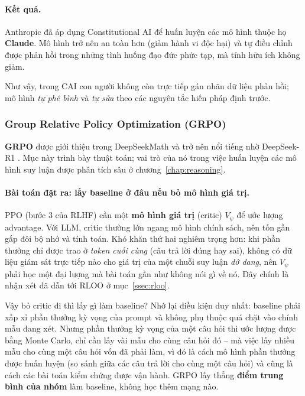 \paragraph{Kết quả.}
    Anthropic đã áp dụng Constitutional AI để huấn luyện các mô hình thuộc họ \textbf{Claude}. Mô hình trở nên an toàn hơn (giảm hành vi độc hại) và tự điều chỉnh được phản hồi trong những tình huống đạo đức phức tạp, mà tính hữu ích không giảm.

\noindent
Như vậy, trong CAI con người không còn trực tiếp gán nhãn dữ liệu phản hồi; mô hình \emph{tự phê bình} và \emph{tự sửa} theo các nguyên tắc hiến pháp định trước.

\subsubsection{Group Relative Policy Optimization (GRPO)}
\label{ssec:grpo}

\textbf{GRPO} được giới thiệu trong DeepSeekMath \cite{shao2024deepseekmath} và trở nên nổi tiếng nhờ DeepSeek-R1 \cite{deepseekai2025r1}. Mục này trình bày thuật toán; vai trò của nó trong việc huấn luyện các mô hình suy luận được phân tích sâu ở chương~\ref{chap:reasoning}.

\paragraph{Bài toán đặt ra: lấy baseline ở đâu nếu bỏ mô hình giá trị.}
PPO (bước 3 của RLHF) cần một \textbf{mô hình giá trị} (critic) $V_\psi$ để ước lượng advantage. Với LLM, critic thường lớn ngang mô hình chính sách, nên tốn gần gấp đôi bộ nhớ và tính toán. Khó khăn thứ hai nghiêm trọng hơn: khi phần thưởng chỉ được trao ở \emph{token cuối cùng} (câu trả lời đúng hay sai), không có dữ liệu giám sát trực tiếp nào cho giá trị của một chuỗi suy luận \emph{dở dang}, nên $V_\psi$ phải học một đại lượng mà bài toán gần như không nói gì về nó. Đây chính là nhận xét đã dẫn tới RLOO ở mục~\ref{ssec:rloo}.

Vậy bỏ critic đi thì lấy gì làm baseline? Nhớ lại điều kiện duy nhất: baseline phải xấp xỉ phần thưởng kỳ vọng của prompt và không phụ thuộc quá chặt vào chính mẫu đang xét. Nhưng phần thưởng kỳ vọng của một câu hỏi thì ước lượng được bằng Monte Carlo, chỉ cần lấy vài mẫu cho cùng câu hỏi đó -- mà việc lấy nhiều mẫu cho cùng một câu hỏi vốn đã phải làm, vì đó là cách mô hình phần thưởng được huấn luyện (so sánh giữa các câu trả lời cho cùng một câu hỏi) và cũng là cách các bài toán kiểm chứng được vận hành. GRPO \cite{shao2024deepseekmath} lấy thẳng \textbf{điểm trung bình của nhóm} làm baseline, không học thêm mạng nào.

